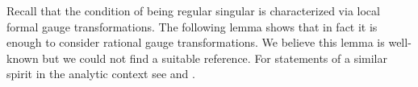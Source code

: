 \documentclass[a4paper, 11pt]{article}
\begin{document}
%



%


Recall that the condition of being regular singular is characterized via local formal gauge transformations. The following lemma shows that in fact it is enough to consider rational gauge transformations. We believe this lemma is well-known but we could not find a suitable reference. For statements of a similar spirit in the analytic context see \cite[Lemma 12.1]{Saul} and \cite[Lemma 3.42]{SVDP}.
\end{document}
